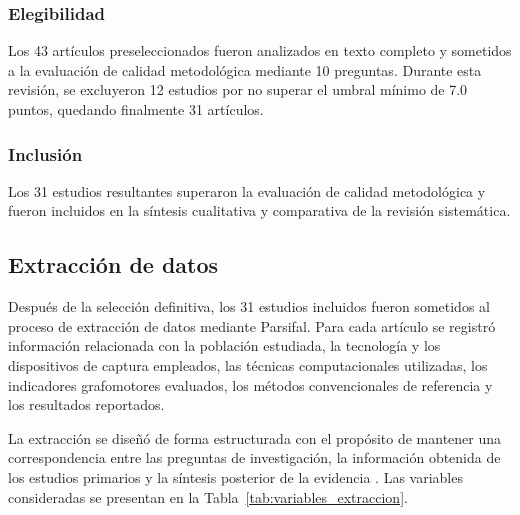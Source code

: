 \documentclass{iaesarticle}
\begin{document}
\subsubsection{Elegibilidad}

Los 43 artículos preseleccionados fueron analizados en texto completo y sometidos a la evaluación de calidad metodológica mediante 10 preguntas. Durante esta revisión, se excluyeron 12 estudios por no superar el umbral mínimo de 7.0 puntos, quedando finalmente 31 artículos.

\subsubsection{Inclusión}

Los 31 estudios resultantes superaron la evaluación de calidad metodológica y fueron incluidos en la síntesis cualitativa y comparativa de la revisión sistemática.

\subsection{Extracción de datos}

Después de la selección definitiva, los 31 estudios incluidos fueron sometidos al proceso de extracción de datos mediante Parsifal. Para cada artículo se registró información relacionada con la población estudiada, la tecnología y los dispositivos de captura empleados, las técnicas computacionales utilizadas, los indicadores grafomotores evaluados, los métodos convencionales de referencia y los resultados reportados.

La extracción se diseñó de forma estructurada con el propósito de mantener una correspondencia entre las preguntas de investigación, la información obtenida de los estudios primarios y la síntesis posterior de la evidencia \cite{cruzes2011}. Las variables consideradas se presentan en la Tabla~\ref{tab:variables_extraccion}.
\end{document}
